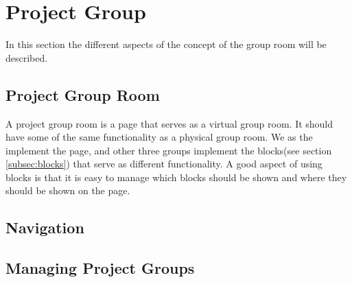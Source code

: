 \section{Project Group}
In this section the different aspects of the concept of the group room will be described.
\subsection{Project Group Room}
A project group room is a page that serves as a virtual group room. 
It should have some of the same functionality as a physical group room.
We as the \groupname{} implement the page, and other three groups implement the blocks(see section \ref{subsec:blocks}) that serve as different functionality.
A good aspect of using blocks is that it is easy to manage which blocks should be shown and where they should be shown on the page.
 



\subsection{Navigation}

\subsection{Managing Project Groups}